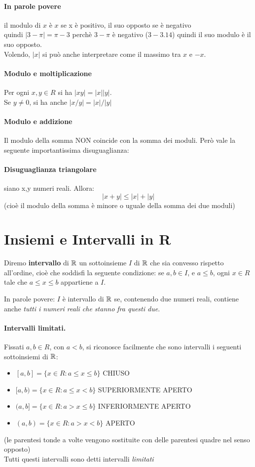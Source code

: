 \documentclass[12pt, a4paper, openany]{book}
\newcommand{\definizione}[1]{\begin{box_definizione} #1 \end{box_definizione}}
\begin{document}
\paragraph{In parole povere} il modulo di $x$ è $x$ se x è positivo, il suo opposto se è negativo\\
quindi $|3 - \pi| = \pi - 3$ perchè $3-\pi$ è negativo ($3 - 3.14$) quindi il suo modulo è il suo opposto.
\\Volendo, $|x|$ si può anche interpretare come il massimo tra $x$ e $-x$.

\paragraph{Modulo e moltiplicazione}
Per ogni $x, y \in R$ si ha $|xy| = |x||y|$.\\Se $y\neq0$, si ha anche $|x/y|=|x|/|y|$
\paragraph{Modulo e addizione}
Il modulo della somma NON coincide con la somma dei moduli. Però vale la seguente importantissima disuguaglianza:
\paragraph{Disuguaglianza triangolare} siano x,y numeri reali. Allora:
\begin{equation}
    |x+y| \leq |x| + |y|
\end{equation} 
(cioè il modulo della somma è minore o uguale della somma dei due moduli)

\section{Insiemi e Intervalli in R}
\definizione{
    Diremo \textbf{intervallo} di $\mathbb{R}$ un sottoinsieme $I$ di $\mathbb{R}$ che sia convesso rispetto all'ordine, cioè che soddisfi la seguente condizione:
    se $a,b \in I$, e $a \leq b$, ogni $x\in R$ tale che $a \leq x \leq b$ appartiene a $I$. 
}

In parole povere: $I$ è intervallo di $\mathbb{R}$ se, contenendo due numeri reali, contiene anche \emph{tutti i numeri reali che stanno fra questi due}.

\paragraph{Intervalli limitati.}
Fissati $a, b \in R$, con $a<b$, si riconosce facilmente che sono intervalli i seguenti sottoinsiemi di $\mathbb{R}$:
\begin{itemize}
    \item[] $[a,b] = \{x \in R : a \leq x \leq b\}$ CHIUSO
    \item[] $[a,b) = \{x \in R : a \leq x < b\}$ SUPERIORMENTE APERTO
    \item[] $(a,b] = \{x \in R : a > x \leq b\}$ INFERIORMENTE APERTO
    \item[] $(a,b) = \{x \in R : a > x < b\}$ APERTO
\end{itemize}
{\tiny(le parentesi tonde a volte vengono sostituite con delle parentesi quadre nel senso opposto)}
\\Tutti questi intervalli sono detti intervalli \emph{limitati}
\end{document}
